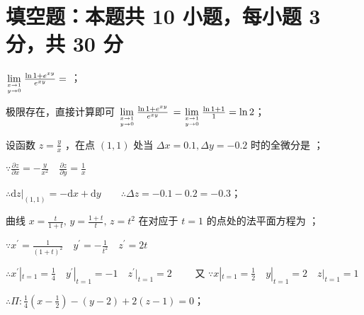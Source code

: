 
\section{填空题：本题共 10 小题，每小题 3 分，共 30 分}

\begin{question}[points = 3]
    $\lim\limits_{x \to 1 \atop y \to 0} \frac{\ln{1 + e^{xy}}}{e^{xy}} = $ \fillin[$\ln{2}$]；
\end{question}
\begin{solution}
    极限存在，直接计算即可 $\lim\limits_{x \to 1 \atop y \to 0} \frac{\ln{1 + e^{xy}}}{e^{xy}}$
    $= \lim\limits_{x \to 1 \atop y \to 0} \frac{\ln{1 + 1}}{1} = \ln{2}$；
\end{solution}

\begin{question}[points = 3]
    设函数 $z = \frac{y}{x}$ ，在点 $(1, 1)$ 处当 $\Delta x = 0.1, \Delta y = - 0.2$ 时的全微分是 \fillin[$-0.3$]；
\end{question}
\begin{solution}
    $\because \frac{\partial z}{\partial x} = -\frac{y}{x^2} \quad \frac{\partial z}{\partial y} = \frac{1}{x}$

    $\therefore \mathrm{d}z|_{(1, 1)} = -\mathrm{d}x + \mathrm{d}y \qquad \therefore \Delta z = -0.1 - 0.2 = -0.3$；
\end{solution}

\begin{question}[points = 3]
    曲线 $x = \frac{t}{1 + t}, \, y = \frac{1 + t}{t}, \, z = t^2$ 在对应于 $t = 1$ 的点处的法平面方程为
    \fillin[$\frac{1}{4}(x - \frac{1}{2}) - (y - 2) + 2(z - 1) = 0$]；
\end{question}
\begin{solution}
    $\because x^{\prime} = \frac{1}{(1 + t)^2} \quad y^{\prime} = -\frac{1}{t^2} \quad z^{\prime} = 2t$

    $\therefore x^{\prime}|_{t = 1} = \frac{1}{4} \quad y^{\prime}|_{t = 1} = -1 \quad z^{\prime}|_{t = 1} = 2 \qquad$
    又 $\because x|_{t = 1} = \frac{1}{2} \quad y|_{t = 1} = 2 \quad z|_{t = 1} = 1$

    $\therefore \Pi: \frac{1}{4}(x - \frac{1}{2}) - (y - 2) + 2(z - 1) = 0$；
\end{solution}

